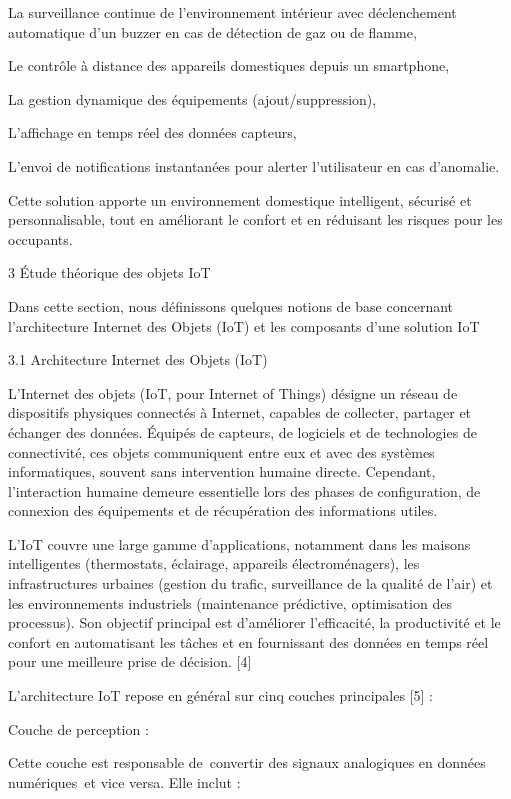 \documentclass{article}
\begin{document}
La surveillance continue de l’environnement intérieur avec déclenchement automatique d’un buzzer en cas de détection de gaz ou de flamme,

Le contrôle à distance des appareils domestiques depuis un smartphone,

La gestion dynamique des équipements (ajout/suppression),

L’affichage en temps réel des données capteurs,

L’envoi de notifications instantanées pour alerter l’utilisateur en cas d’anomalie.

Cette solution apporte un environnement domestique intelligent, sécurisé et personnalisable, tout en améliorant le confort et en réduisant les risques pour les occupants.

3 Étude théorique des objets IoT

Dans cette section, nous définissons quelques notions de base concernant l’architecture Internet des Objets (IoT) et les composants d’une solution IoT

3.1 Architecture Internet des Objets (IoT)

​L'Internet des objets (IoT, pour Internet of  Things) désigne un réseau de dispositifs physiques connectés à Internet, capables de collecter, partager et échanger des données. Équipés de capteurs, de logiciels et de technologies de connectivité, ces objets communiquent entre eux et avec des systèmes informatiques, souvent sans intervention humaine directe. Cependant, l'interaction humaine demeure essentielle lors des phases de configuration, de connexion des équipements et de récupération des informations utiles.​

L'IoT couvre une large gamme d’applications, notamment dans les maisons intelligentes (thermostats, éclairage, appareils électroménagers), les infrastructures urbaines (gestion du trafic, surveillance de la qualité de l'air) et les environnements industriels (maintenance prédictive, optimisation des processus). Son objectif principal est d'améliorer l'efficacité, la productivité et le confort en automatisant les tâches et en fournissant des données en temps réel pour une meilleure prise de décision. [4]

L’architecture IoT repose en général sur cinq couches principales [5] :

Couche de perception :

Cette couche est responsable de convertir des signaux analogiques en données numériques et vice versa. Elle inclut :
\end{document}
